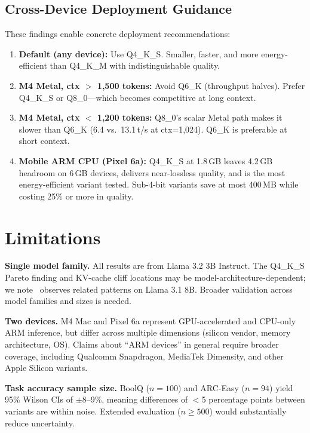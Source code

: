 \documentclass{article}
\begin{document}
\subsection{Cross-Device Deployment Guidance}

These findings enable concrete deployment recommendations:
\begin{enumerate}
  \item \textbf{Default (any device):} Use Q4\_K\_S. Smaller, faster, and more energy-efficient than Q4\_K\_M with indistinguishable quality.
  \item \textbf{M4 Metal, ctx $>$ 1,500 tokens:} Avoid Q6\_K (throughput halves). Prefer Q4\_K\_S or Q8\_0—which becomes competitive at long context.
  \item \textbf{M4 Metal, ctx $<$ 1,200 tokens:} Q8\_0's scalar Metal path makes it slower than Q6\_K (6.4 vs.\ 13.1\,t/s at ctx=1,024). Q6\_K is preferable at short context.
  \item \textbf{Mobile ARM CPU (Pixel 6a):} Q4\_K\_S at 1.8\,GB leaves 4.2\,GB headroom on 6\,GB devices, delivers near-lossless quality, and is the most energy-efficient variant tested. Sub-4-bit variants save at most 400\,MB while costing 25\% or more in quality.
\end{enumerate}

\section{Limitations}
\label{sec:limitations}

\textbf{Single model family.} All results are from Llama 3.2 3B Instruct. The Q4\_K\_S Pareto finding and KV-cache cliff locations may be model-architecture-dependent; we note~\cite{whichquant} observes related patterns on Llama 3.1 8B. Broader validation across model families and sizes is needed.

\textbf{Two devices.} M4 Mac and Pixel 6a represent GPU-accelerated and CPU-only ARM inference, but differ across multiple dimensions (silicon vendor, memory architecture, OS). Claims about ``ARM devices'' in general require broader coverage, including Qualcomm Snapdragon, MediaTek Dimensity, and other Apple Silicon variants.

\textbf{Task accuracy sample size.} BoolQ ($n=100$) and ARC-Easy ($n=94$) yield 95\% Wilson CIs of $\pm$8--9\%, meaning differences of $<$5 percentage points between variants are within noise. Extended evaluation ($n \geq 500$) would substantially reduce uncertainty.
\end{document}
